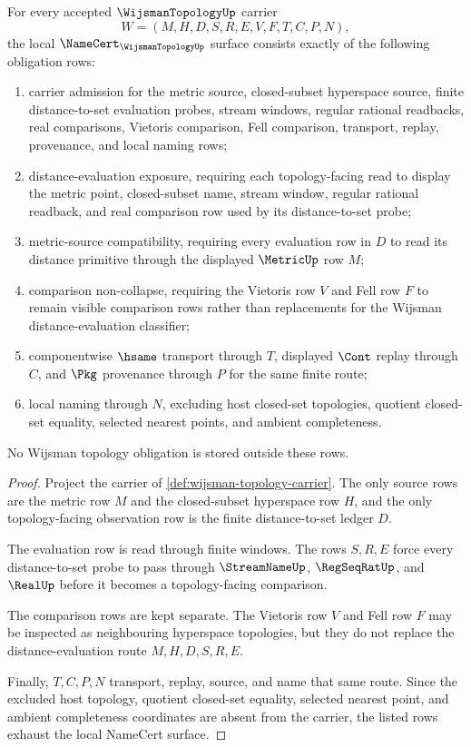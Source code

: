 \begin{theorem}
\label{thm:wijsman-topology-namecert-obligations}
For every accepted $\WijsmanTopologyUp$ carrier
$$
W=(M,H,D,S,R,E,V,F,T,C,P,N),
$$
the local $\NameCert_{\WijsmanTopologyUp}$ surface consists exactly of the following obligation rows:
\begin{enumerate}
\item carrier admission for the metric source, closed-subset hyperspace source, finite distance-to-set evaluation probes, stream windows, regular rational readbacks, real comparisons, Vietoris comparison, Fell comparison, transport, replay, provenance, and local naming rows;
\item distance-evaluation exposure, requiring each topology-facing read to display the metric point, closed-subset name, stream window, regular rational readback, and real comparison row used by its distance-to-set probe;
\item metric-source compatibility, requiring every evaluation row in $D$ to read its distance primitive through the displayed $\MetricUp$ row $M$;
\item comparison non-collapse, requiring the Vietoris row $V$ and Fell row $F$ to remain visible comparison rows rather than replacements for the Wijsman distance-evaluation classifier;
\item componentwise $\hsame$ transport through $T$, displayed $\Cont$ replay through $C$, and $\Pkg$ provenance through $P$ for the same finite route;
\item local naming through $N$, excluding host closed-set topologies, quotient closed-set equality, selected nearest points, and ambient completeness.
\end{enumerate}
No Wijsman topology obligation is stored outside these rows.
\end{theorem}
\begin{proof}
Project the carrier of \autoref{def:wijsman-topology-carrier}. The only source rows are the metric row $M$ and the closed-subset hyperspace row $H$, and the only topology-facing observation row is the finite distance-to-set ledger $D$.

The evaluation row is read through finite windows. The rows $S,R,E$ force every distance-to-set probe to pass through $\StreamNameUp$, $\RegSeqRatUp$, and $\RealUp$ before it becomes a topology-facing comparison.

The comparison rows are kept separate. The Vietoris row $V$ and Fell row $F$ may be inspected as neighbouring hyperspace topologies, but they do not replace the distance-evaluation route $M,H,D,S,R,E$.

Finally, $T,C,P,N$ transport, replay, source, and name that same route. Since the excluded host topology, quotient closed-set equality, selected nearest point, and ambient completeness coordinates are absent from the carrier, the listed rows exhaust the local NameCert surface.
\end{proof}

